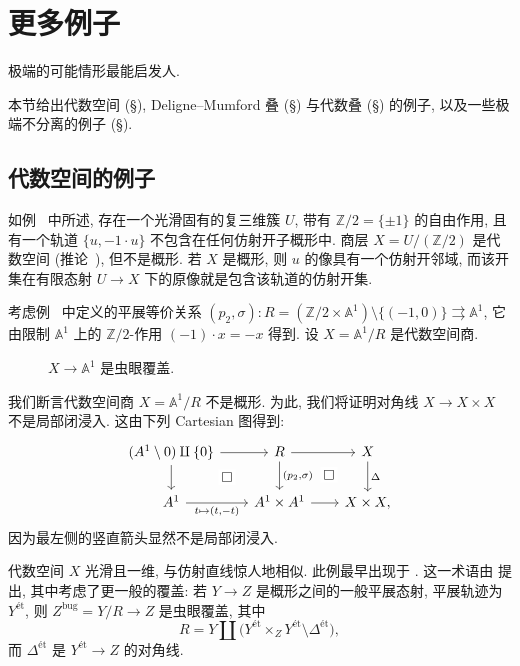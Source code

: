 \begingroup
\raggedbottom
\section{更多例子}\label{src:4.9}
\begin{epigraph}
极端的可能情形最能启发人.
\end{epigraph}
本节给出代数空间 (\S{}), Deligne--Mumford 叠 (\S{}) 与代数叠 (\S{}) 的例子, 以及一些极端不分离的例子 (\S{}).

\subsection{代数空间的例子}\label{src:4.9.1-subsection}
\begin{example}\label{src:4.9.1}
如例~ 中所述, 存在一个光滑固有的复三维簇 $U$, 带有 $\mathbb Z/2=\{\pm1\}$ 的自由作用, 且有一个轨道 $\{u,-1\cdot u\}$ 不包含在任何仿射开子概形中. 商层 $X=U/(\mathbb Z/2)$ 是代数空间 (推论~), 但不是概形. 若 $X$ 是概形, 则 $u$ 的像具有一个仿射开邻域, 而该开集在有限态射 $U\to X$ 下的原像就是包含该轨道的仿射开集.
\end{example}
\begin{example}[虫眼覆盖]\label{src:4.9.2}
考虑例~ 中定义的平展等价关系 $(p_2,\sigma):R=(\mathbb Z/2\times\mathbb A^1)\setminus\{(-1,0)\}\rightrightarrows\mathbb A^1$, 它由限制 $\mathbb A^1$ 上的 $\mathbb Z/2$-作用 $(-1)\cdot x=-x$ 得到. 设 $X=\mathbb A^1/R$ 是代数空间商.
\begin{figure}[H]
\centering
\caption{$X\to\mathbb A^1$ 是虫眼覆盖.}\label{src:4.9.3}
\end{figure}
我们断言代数空间商 $X=\mathbb A^1/R$ 不是概形. 为此, 我们将证明对角线 $X\to X\times X$ 不是局部闭浸入. 这由下列 Cartesian 图得到:
\[
\begin{tikzcd}[column sep=2em]
(\mathbb A^1\setminus0)\amalg\{0\}\arrow[r]\arrow[d]&R\arrow[r]\arrow[d,"{(p_2,\sigma)}"]&X\arrow[d,"\Delta"]\\
\mathbb A^1\arrow[r,"{t\mapsto(t,-t)}"']\arrow[ur,phantom,"\square" description]&\mathbb A^1\times\mathbb A^1\arrow[r]\arrow[ur,phantom,"\square" description]&X\times X,
\end{tikzcd}
\]
因为最左侧的竖直箭头显然不是局部闭浸入.

代数空间 $X$ 光滑且一维, 与仿射直线惊人地相似. 此例最早出现于 \cite[第 $311$ 页]{Art74a}.  这一术语由 \cite[\S$4.2.2$]{Kol92} 提出, 其中考虑了更一般的覆盖: 若 $Y\to Z$ 是概形之间的一般平展态射, 平展轨迹为 $Y^{\text{ét}}$, 则 $Z^{\mathrm{bug}}=Y/R\to Z$ 是虫眼覆盖, 其中
\[
R=Y\amalg\bigl(Y^{\text{ét}}\times_Z Y^{\text{ét}}\setminus\Delta^{\text{ét}}\bigr),
\]
而 $\Delta^{\text{ét}}$ 是 $Y^{\text{ét}}\to Z$ 的对角线.
\end{example}
